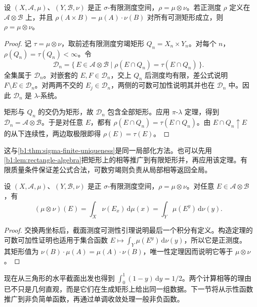 \begin{theorem}\label{b1:thm:product-measure-uniqueness}
设 \((X,\mathcal A,\mu)\)、\((Y,\mathcal B,\nu)\) 是正 \(\sigma\)-有限测度空间，\(\rho=\mu\otimes\nu\)。若正测度 \(\rho\) 定义在 \(\mathcal A\otimes\mathcal B\) 上，并且 \(\rho(A\times B)=\mu(A)\cdot\nu(B)\) 对所有可测矩形成立，则 \(\rho=\mu\otimes\nu\)。
\end{theorem}
\begin{proof}
记 \(\tau=\mu\otimes\nu\)，取前述有限测度穷竭矩形 \(Q_n=X_n\times Y_n\)。对每个 \(n\)，\(\rho(Q_n)=\tau(Q_n)<\infty\)。令
\[
\mathcal D_n=\{\,E\in\mathcal A\otimes\mathcal B
\mid\rho(E\cap Q_n)=\tau(E\cap Q_n)\,\}.
\]
全集属于 \(\mathcal D_n\)。对嵌套的 \(E,F\in\mathcal D_n\)，交上 \(Q_n\) 后测度均有限，差公式说明 \(F\setminus E\in\mathcal D_n\)。对两两不交的 \(E_j\in\mathcal D_n\)，两侧的可数可加性说明其并也在 \(\mathcal D_n\) 中。因此 \(\mathcal D_n\) 是 \(\lambda\)-系统。

矩形与 \(Q_n\) 的交仍为矩形，故 \(\mathcal D_n\) 包含全部矩形。应用 \(\pi\)-\(\lambda\) 定理，得到 \(\mathcal D_n=\mathcal A\otimes\mathcal B\)。于是对任意 \(E\)，都有 \(\rho(E\cap Q_n)=\tau(E\cap Q_n)\)。由 \(E\cap Q_n\uparrow E\) 的从下连续性，两边取极限即得 \(\rho(E)=\tau(E)\)。
\end{proof}

这与\cref{b1:thm:sigma-finite-uniqueness}是同一局部化方法。也可以先用\cref{b1:lem:rectangle-algebra}把矩形上的相等推广到有限矩形并，再应用该定理。有限质量条件保证差公式合法，可数穷竭则负责从局部相等返回全局。

\begin{corollary}\label{b1:cor:product-section-formula}
设 \((X,\mathcal A,\mu)\)、\((Y,\mathcal B,\nu)\) 是正 \(\sigma\)-有限测度空间，\(\rho=\mu\otimes\nu\)。对任意 \(E\in\mathcal A\otimes\mathcal B\)，有
\[
(\mu\otimes\nu)(E)
=\int_X\nu(E_x)\,\mathrm d\mu(x)
=\int_Y\mu(E^y)\,\mathrm d\nu(y).
\]
\end{corollary}
\begin{proof}
交换两坐标后，截面测度可测性引理说明最后一个积分有定义。构造定理的可数可加性证明也适用于集合函数 \(E\mapsto\int_Y\mu(E^y)\,\mathrm d\nu(y)\)，所以它是正测度。其矩形值为 \(\nu(B)\cdot\mu(A)=\mu(A)\cdot\nu(B)\)，唯一性定理因而说明它等于 \(\mu\otimes\nu\)。
\end{proof}

现在从三角形的水平截面出发也得到 \(\int_0^1(1-y)\,\mathrm dy=1/2\)。两个计算相等的理由已不只是几何直观，而是它们在生成矩形上给出同一组数据。下一节将从示性函数推广到非负简单函数，再通过单调收敛处理一般非负函数。

